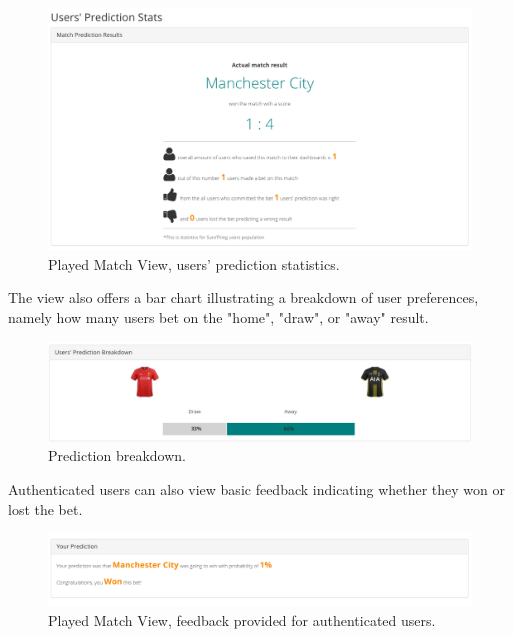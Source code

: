 \begin{figure}[H]
	\begin{center}
		\includegraphics[width=.90\textwidth]{impl/images/predictionStats}
		\caption{Played Match View, users' prediction statistics.} \label{fig:predictionStats}
	\end{center}
\end{figure}

The view also offers a bar chart illustrating a breakdown of user preferences, namely how many users bet on the "home", "draw", or "away" result.

\begin{figure}[H]
	\begin{center}
		\includegraphics[width=.90\textwidth]{impl/images/predictionBreakdown}
		\caption{Prediction breakdown.} \label{fig:predictionBreakdown}
	\end{center}
\end{figure}

Authenticated users can also view basic feedback indicating whether they won or lost the bet. 

\begin{figure}[H]
	\begin{center}
		\includegraphics[width=.90\textwidth]{impl/images/feedback}
		\caption{Played Match View, feedback provided for authenticated users.} \label{fig:feedback}
	\end{center}
\end{figure}

